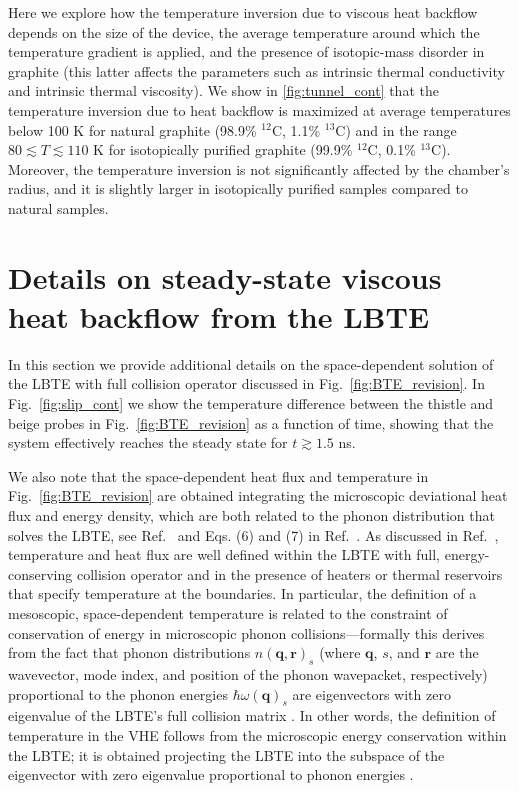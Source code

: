 \documentclass[
prb,
twocolumn,
superscriptaddress,
 amsmath,amssymb,
 aps,
longbibliography,
]{revtex4-2}
\begin{document}
Here we explore how the temperature inversion due to viscous heat backflow depends on the size of the device, the average temperature around which the temperature gradient is applied, and the presence of isotopic-mass disorder in graphite (this latter affects the parameters such as intrinsic thermal conductivity and intrinsic thermal viscosity).
We show in \ref{fig:tunnel_cont} that the temperature inversion due to heat backflow is maximized at average temperatures below 100 K for natural graphite (98.9\% $^{12}$C, 1.1\% $^{13}$C) and in the range $80\lesssim T\lesssim 110$ K for isotopically purified graphite (99.9\% $^{12}$C, 0.1\% $^{13}$C). Moreover, the temperature inversion is not significantly affected by the chamber's radius, and it is slightly larger in isotopically purified samples compared to natural samples.


\section{Details on steady-state viscous heat backflow from the LBTE}
\label{sub:steady_state_viscous_heat_backflow_from_the_space_dependent_solution_of_the_full_boltzmann_transport_equation}
In this section we provide additional details on the space-dependent solution of the LBTE with full collision operator discussed in Fig.~\ref{fig:BTE_revision}.
In Fig.~\ref{fig:slip_cont} we show the temperature difference between the thistle and beige probes in Fig.~\ref{fig:BTE_revision} as a function of time, showing that the system effectively reaches the steady state for $t\gtrsim 1.5$ ns.

We also note that the space-dependent heat flux and temperature in Fig.~\ref{fig:BTE_revision} are obtained integrating the microscopic deviational heat flux and energy density, which are both related to the phonon distribution that solves the LBTE, see Ref.~\cite{peraud_efficient_2011} and Eqs. (6) and (7) in Ref.~\cite{raya-moreno_bte-barna_2022}. As discussed in Ref.~\cite{allen_temperature_2018}, temperature and heat flux are well defined within the LBTE with full, energy-conserving collision operator and in the presence of heaters or thermal reservoirs that specify temperature at the boundaries. In particular, the definition of a mesoscopic, space-dependent temperature is related to the constraint of conservation of energy in microscopic phonon collisions---formally this derives from the fact that phonon distributions $n(\bm{q},\bm{r})_s$ (where $\bm{q}$, $s$, and $\bm{r}$ are the wavevector, mode index, and position of the phonon wavepacket, respectively) proportional to the phonon energies $\hbar\omega(\bm{q})_s$ are eigenvectors with zero eigenvalue of the LBTE's full collision matrix \cite{spohn_phonon_2006,allen_temperature_2018}. In other words, the definition of temperature in the VHE follows from the microscopic energy conservation within the LBTE; it is obtained projecting the LBTE into the subspace of the eigenvector with zero eigenvalue proportional to phonon energies \cite{Simoncelli2020}.
\end{document}
